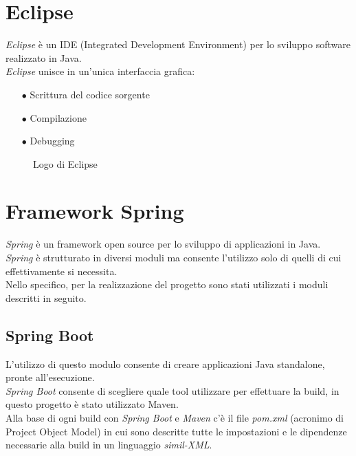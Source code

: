 \section{Eclipse}\label{sec:eclipse}
\emph{Eclipse} è un IDE (Integrated Development Environment) per lo sviluppo software realizzato in Java.\\
\emph{Eclipse} unisce in un’unica interfaccia grafica:
\begin{itemize}
	\item[$\bullet$]Scrittura del codice sorgente
	\item[$\bullet$]Compilazione
	\item[$\bullet$]Debugging
\end{itemize}
\begin{figure}[ht]
	\centering
	\caption{Logo di Eclipse}
	\label{fig:one}
\end{figure}

\section{Framework Spring}\label{sec:spring}
\emph{Spring} è un framework open source per lo sviluppo di applicazioni in Java.\\
\emph{Spring} è strutturato in diversi moduli ma consente l'utilizzo solo di quelli di cui effettivamente si necessita.\\
Nello specifico, per la realizzazione del progetto sono stati utilizzati i moduli descritti in seguito.
\subsection{Spring Boot}\label{sec:springboot}
L’utilizzo di questo modulo consente di creare applicazioni Java standalone, pronte all’esecuzione.\\
\emph{Spring Boot} consente di scegliere quale tool utilizzare per effettuare la build, in questo progetto è stato utilizzato Maven.\\
Alla base di ogni build con \emph{Spring Boot} e \emph{Maven} c’è il file \emph{pom.xml} (acronimo di Project Object Model) in cui sono descritte tutte le impostazioni e le dipendenze necessarie alla build in un linguaggio \emph{simil-XML}.
